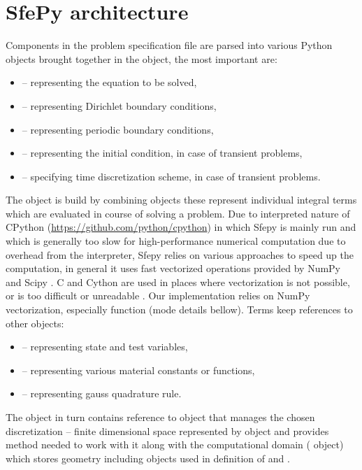 \section{SfePy architecture}
Components in the problem specification file are parsed into various Python objects  
brought together in the  object, the most important are:
\begin{itemize}
	\item {} -- representing the equation to be solved,
	\item {} -- representing Dirichlet boundary conditions,
	\item {} -- representing periodic boundary conditions,
	\item {} -- representing the initial condition, in case of transient problems,
	\item {} -- specifying time discretization scheme, in case of transient problems.
\end{itemize}
The  object is build by combining  objects these 
represent individual integral terms which are evaluated in course of solving a problem.
Due to interpreted nature of CPython (\url{https://github.com/python/cpython}) in which 
Sfepy is mainly run and which is generally too slow for high-performance numerical 
computation due to overhead from the interpreter, Sfepy relies on various approaches to 
speed up the computation, in general it uses fast vectorized operations provided by NumPy 
and Scipy \cite{SciPy-NMeth2020}. C and Cython are used in places where vectorization is 
not possible, or is too difficult or unreadable \cite{Cimrman_Lukes_Rohan_2019}. 
Our implementation relies on NumPy vectorization, especially  
function (mode details bellow). Terms keep references to other objects:
\begin{itemize}
	\item {} -- representing state and test variables,
	\item {} -- representing various material constants or functions,
	\item {} -- representing gauss quadrature rule.
\end{itemize}
The  object in turn contains reference to  object that 
manages the chosen discretization -- finite dimensional space represented by 
 object and provides method needed to work with it along with the 
computational domain ( object) which stores geometry including
 objects used in definition of  and 
.










